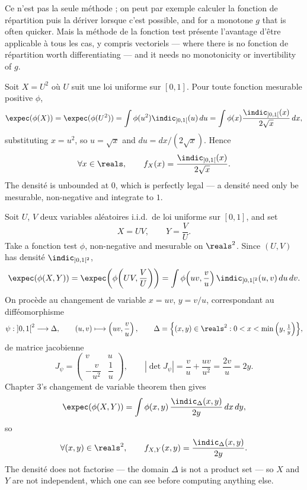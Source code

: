 Ce n'est pas la seule méthode ; on peut par exemple calculer la fonction de
répartition puis la dériver lorsque c'est possible, and for a monotone $g$ that is
often quicker. Mais la méthode de la fonction test présente l'avantage d'être
applicable à tous les cas, y compris vectoriels --- where there is no fonction de
répartition worth differentiating --- and it needs no monotonicity or
invertibility of $g$.

\begin{example}
  Soit $X = U^{2}$ où $U$ suit une loi uniforme sur $[0,1]$. Pour toute fonction
  mesurable positive $\phi$,
  \[
    \expec(\phi(X)) = \expec(\phi(U^{2}))
      = \int \phi(u^{2}) \indic_{]0,1[}(u)\,du
      = \int \phi(x) \frac{\indic_{]0,1[}(x)}{2\sqrt{x}}\,dx ,
  \]
  substituting $x = u^{2}$, so $u = \sqrt{x}$ and $du = dx/(2\sqrt{x})$. Hence
  \[
    \forall x \in \reals, \qquad f_{X}(x) = \frac{\indic_{]0,1[}(x)}{2\sqrt{x}} .
  \]
  The densité is unbounded at $0$, which is perfectly legal --- a densité need
  only be mesurable, non-negative and integrate to $1$.
\end{example}

\begin{example}
  Soit $U$, $V$ deux variables aléatoires i.i.d.\ de loi uniforme sur $[0,1]$, and
  set
  \[
    X = UV, \qquad Y = \frac{V}{U} .
  \]
  Take a fonction test $\phi$, non-negative and mesurable on $\reals^{2}$. Since
  $(U,V)$ has densité $\indic_{]0,1[^{2}}$,
  \[
    \expec(\phi(X,Y))
      = \expec\!\left(\phi\!\left(UV, \frac{V}{U}\right)\right)
      = \int \phi\!\left(uv, \frac{v}{u}\right)\indic_{]0,1[^{2}}(u,v)\,du\,dv .
  \]
  On procède au changement de variable $x = uv$, $y = v/u$, correspondant au
  difféomorphisme
  \[
    \psi : \left]0,1\right[^{2} \longrightarrow \Delta,
    \qquad
    (u,v) \longmapsto \left(uv, \frac{v}{u}\right),
    \qquad
    \Delta = \Big\{(x,y) \in \reals^{2} : 0 < x < \min\Big(y,\tfrac{1}{y}\Big)\Big\},
  \]
  de matrice jacobienne
  \[
    J_{\psi} =
    \begin{pmatrix}
      v & u \\[2pt] -\dfrac{v}{u^{2}} & \dfrac{1}{u}
    \end{pmatrix},
    \qquad
    |\det J_{\psi}| = \frac{v}{u} + \frac{uv}{u^{2}} = \frac{2v}{u} = 2y .
  \]
  Chapter 3's changement de variable theorem then gives
  \[
    \expec(\phi(X,Y)) = \int \phi(x,y)\,\frac{\indic_{\Delta}(x,y)}{2y}\,dx\,dy ,
  \]
  so
  \[
    \forall (x,y) \in \reals^{2}, \qquad
    f_{X,Y}(x,y) = \frac{\indic_{\Delta}(x,y)}{2y} .
  \]
  The densité does not factorise --- the domain $\Delta$ is not a product set ---
  so $X$ and $Y$ are not independent, which one can see before computing anything
  else.
\end{example}

